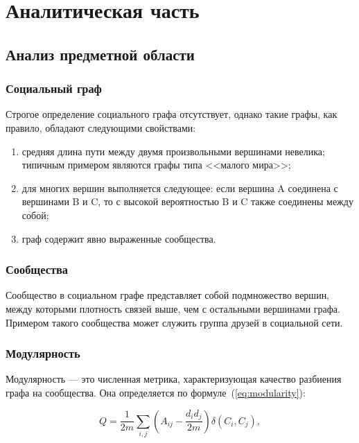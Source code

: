 \chapter{Аналитическая часть}

\section{Анализ предметной области}

\subsection{Социальный граф}

Строгое определение социального графа отсутствует, однако такие графы, как правило, обладают следующими свойствами:

\begin{enumerate}
	\item средняя длина пути между двумя произвольными вершинами невелика; типичным примером являются графы типа <<малого мира>>;
	\item для многих вершин выполняется следующее: если вершина A соединена с вершинами B и C, то с высокой вероятностью B и C также соединены между собой;
	\item граф содержит явно выраженные сообщества.
\end{enumerate}

\subsection{Сообщества}

Сообщество в социальном графе представляет собой подмножество вершин, между которыми плотность связей выше, чем с остальными вершинами графа. Примером такого сообщества может служить группа друзей в социальной сети.

\subsection{Модулярность}

Модулярность — это численная метрика, характеризующая качество разбиения графа на сообщества. Она определяется по формуле~(\ref{eq:modularity}):

\begin{equation}
	\label{eq:modularity}
	Q = \frac{1}{2m}\sum_{i,j}\left(A_{ij} - \frac{d_i d_j}{2m}\right)\delta(C_i, C_j),
\end{equation}

